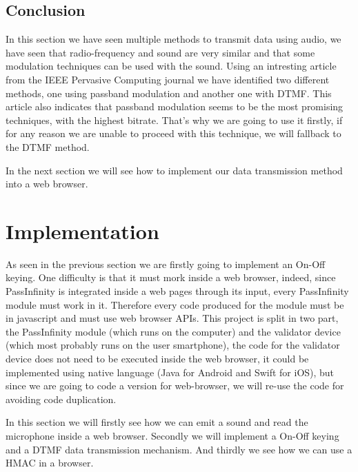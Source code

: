 \documentclass[twocolumn,14pt]{extarticle}
\begin{document}
\subsection{Conclusion}
In this section we have seen multiple methods to transmit data using audio, we have seen that radio-frequency and sound are very similar and that some modulation techniques can be used with the sound. Using an intresting article from the IEEE Pervasive Computing journal we have identified two different methods, one using passband modulation and another one with DTMF. This article also indicates that passband modulation seems to be the most promising techniques, with the highest bitrate. That's why we are going to use it firstly, if for any reason we are unable to proceed with this technique, we will fallback to the DTMF method.

In the next section we will see how to implement our data transmission method into a web browser.

\section{Implementation}
\label{sec:implementation}
As seen in the previous section we are firstly going to implement an On-Off keying. One difficulty is that it must mork inside a web browser, indeed, since PassInfinity is integrated inside a web pages through its input, every PassInfinity module must work in it. Therefore every code produced for the module must be in javascript and must use web browser APIs. 
This project is split in two part, the PassInfinity module (which runs on the computer) and the validator device (which most probably runs on the user smartphone), the code for the validator device does not need to be executed inside the web browser, it could be implemented using native language (Java for Android and Swift for iOS), but since we are going to code a version for web-browser, we will re-use the code for avoiding code duplication.

In this section we will firstly see how we can emit a sound and read the microphone inside a web browser. Secondly we will implement a On-Off keying and a DTMF data transmission mechanism. And thirdly we see how we can use a HMAC in a browser.
\end{document}
